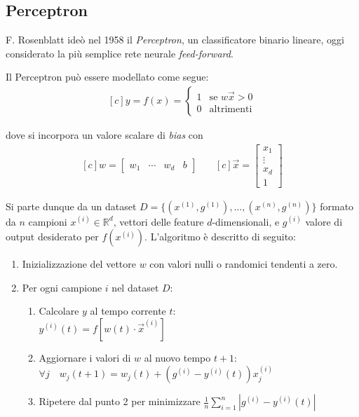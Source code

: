 \subsection{Perceptron}
F. Rosenblatt ideò nel 1958 il \textit{Perceptron}\cite{rosenblatt1958perceptron}, un classificatore binario lineare, oggi considerato la più semplice rete neurale \textit{feed-forward}.

Il Perceptron può essere modellato come segue:
\begin{equation*}
	\begin{aligned}[c]
		y = f(x) =
			\begin{cases}
				1 &\text{se } w\vec{x} > 0 \\
				0 &\text{altrimenti}
			\end{cases}
	\end{aligned}
\end{equation*}

dove si incorpora un valore scalare di \textit{bias} con 
\begin{equation*}
	\begin{aligned}[c]
		w = \begin{bmatrix}
			w_{1} & \cdots & w_{d} & b
		\end{bmatrix}
	\end{aligned}
	\quad
	\begin{aligned}[c]
		\vec{x} = \begin{bmatrix}
			x_{1} \\
			\vdots \\
			x_{d} \\
			1
		\end{bmatrix}
	\end{aligned}
\end{equation*}

Si parte dunque da un dataset $D = \{(x^{(1)},g^{(1)}),\ldots, (x^{(n)},g^{(n)})\}$ formato da $n$ campioni $x^{(i)} \in \mathbb{R}^{d}$, vettori delle feature $d$-dimensionali, e $g^{(i)}$ valore di output desiderato per $f(x^{(i)})$. L'algoritmo è descritto di seguito:

\begin{enumerate}
	\item
		Inizializzazione del vettore $w$ con valori nulli o randomici tendenti a zero.
	\item
		Per ogni campione $i$ nel dataset $D$:
		\begin{enumerate}
			\item
				Calcolare $y$ al tempo corrente $t$: \\
				$y^{(i)}(t) = f[w(t) \cdot \vec{x}^{(i)}]$
			\item
				Aggiornare i valori di $w$ al nuovo tempo $t+1$: \\
				$\forall j \quad w_{j}(t+1) = w_{j}(t) + (g^{(i)} - y^{(i)}(t))x^{(i)}_{j}$
	\item
		Ripetere dal punto 2 per minimizzare $\frac{1}{n}\sum\limits_{i=1}^{n}|g^{(i)} - y^{(i)}(t)|$
		\end{enumerate}
\end{enumerate}

